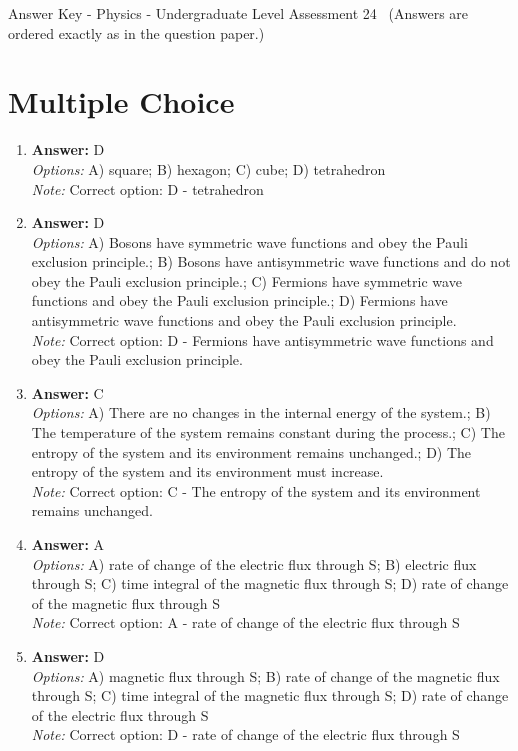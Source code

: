\documentclass[12pt]{article}
\begin{document}
\begin{center}
Answer Key - Physics - Undergraduate Level Assessment 24 \
\small (Answers are ordered exactly as in the question paper.)
\end{center}

\section*{Multiple Choice}
\begin{enumerate}[label=\arabic*.]
\item \textbf{Answer:} D
\\ \textit{Options:} A) square; B) hexagon; C) cube; D) tetrahedron
\\ \textit{Note:} Correct option: D - tetrahedron
\item \textbf{Answer:} D
\\ \textit{Options:} A) Bosons have symmetric wave functions and obey the Pauli exclusion principle.; B) Bosons have antisymmetric wave functions and do not obey the Pauli exclusion principle.; C) Fermions have symmetric wave functions and obey the Pauli exclusion principle.; D) Fermions have antisymmetric wave functions and obey the Pauli exclusion principle.
\\ \textit{Note:} Correct option: D - Fermions have antisymmetric wave functions and obey the Pauli exclusion principle.
\item \textbf{Answer:} C
\\ \textit{Options:} A) There are no changes in the internal energy of the system.; B) The temperature of the system remains constant during the process.; C) The entropy of the system and its environment remains unchanged.; D) The entropy of the system and its environment must increase.
\\ \textit{Note:} Correct option: C - The entropy of the system and its environment remains unchanged.
\item \textbf{Answer:} A
\\ \textit{Options:} A) rate of change of the electric flux through S; B) electric flux through S; C) time integral of the magnetic flux through S; D) rate of change of the magnetic flux through S
\\ \textit{Note:} Correct option: A - rate of change of the electric flux through S
\item \textbf{Answer:} D
\\ \textit{Options:} A) magnetic flux through S; B) rate of change of the magnetic flux through S; C) time integral of the magnetic flux through S; D) rate of change of the electric flux through S
\\ \textit{Note:} Correct option: D - rate of change of the electric flux through S
\end{enumerate}
\end{document}
